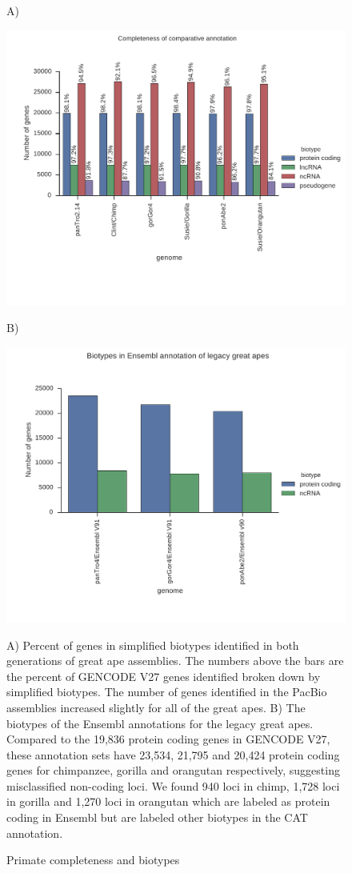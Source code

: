\documentclass[fleqn,10pt]{wlscirep}
\begin{document}
\begin{figure}
\centering

A)

\includegraphics[scale=0.7]{primate_completeness_old_and_new.pdf}

B)

\includegraphics[scale=0.5]{ensembl_primate_biotypes.pdf}

\caption{Primate completeness and biotypes}
A) Percent of genes in simplified biotypes identified in both generations of great ape assemblies. The numbers above the bars are the percent of GENCODE V27 genes identified broken down by simplified biotypes. The number of genes identified in the PacBio assemblies increased slightly for all of the great apes. B) The biotypes of the Ensembl annotations for the legacy great apes. Compared to the 19,836 protein coding genes in GENCODE V27, these annotation sets have 23,534, 21,795 and 20,424 protein coding genes for chimpanzee, gorilla and orangutan respectively, suggesting misclassified non-coding loci. We found 940 loci in chimp, 1,728 loci in gorilla and 1,270 loci in orangutan which are labeled as protein coding in Ensembl but are labeled other biotypes in the CAT annotation.
\label{supp_fig:primate_completeness}
\end{figure}
\end{document}
